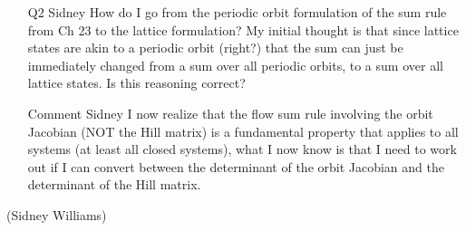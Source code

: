 {\begin{itemize}
\item[Q2 Sidney]
How do I go from the periodic orbit formulation of the sum rule from Ch 23 to the lattice formulation? My initial thought is that since lattice states are akin to a periodic orbit (right?) that the sum can just be immediately changed from a sum over all periodic orbits, to a sum over all lattice states. Is this reasoning correct? 

\item[Comment Sidney]
I now realize that the flow sum rule involving the orbit Jacobian (NOT the Hill matrix) is a fundamental property that applies to all systems (at least all closed systems), what I now know is that I need to work out if I can convert between the determinant of the orbit Jacobian and the determinant of the Hill matrix. 
\end{itemize}
\hfill (Sidney Williams) %
    } %
